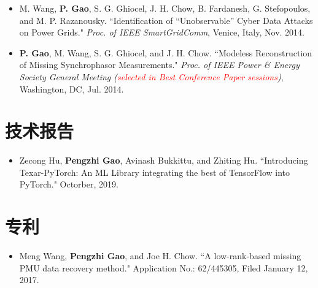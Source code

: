 \documentclass{resume}
\begin{document}
\begin{itemize}[parsep=0.2ex]
\item {M. Wang, {\bf P. Gao}, S. G. Ghiocel, J. H. Chow, B. Fardanesh, G. Stefopoulos, and M. P. Razanousky. ``Identification of ``Unobservable'' Cyber Data Attacks on Power Grids." \emph{Proc. of IEEE SmartGridComm}, Venice, Italy, Nov. 2014.}

\item {{\bf P. Gao}, M. Wang, S. G. Ghiocel, and J. H. Chow. ``Modeless Reconstruction of Missing Synchrophasor Measurements." \emph{Proc. of IEEE Power \& Energy Society General Meeting (\textcolor{red}{selected in Best Conference Paper sessions})}, Washington, DC, Jul. 2014.}
\end{itemize}


\section{技术报告}
\begin{itemize}[parsep=0.2ex]
\item {Zecong Hu, {\bf Pengzhi Gao}, Avinash Bukkittu, and Zhiting Hu. ``Introducing Texar-PyTorch: An ML Library integrating the best of TensorFlow into PyTorch." Octorber, 2019.}
\end{itemize}


\section{专利}
\begin{itemize}[parsep=0.2ex]
\item {Meng Wang, {\bf Pengzhi Gao}, and Joe H. Chow. ``A low-rank-based missing PMU data recovery method." Application No.: 62/445305, Filed January 12, 2017.}
\end{itemize}


\end{document}
